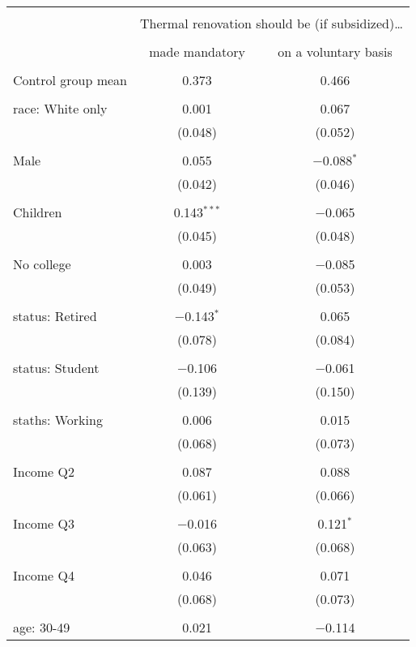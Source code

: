 
\begin{tabular}{@{\extracolsep{5pt}}lcc} 
\\[-1.8ex]\hline 
\hline \\[-1.8ex] 
 & \multicolumn{2}{c}{Thermal renovation should be (if subsidized)…} \\ 
\cline{2-3} 
\\[-1.8ex] & made mandatory & on a voluntary basis \\ 
\hline \\[-1.8ex] 
 Control group mean & 0.373 & 0.466  \\ \hline \\[-1.8ex] race: White only & 0.001 & 0.067 \\ 
  & (0.048) & (0.052) \\ 
  & & \\ 
 Male & 0.055 & $-$0.088$^{*}$ \\ 
  & (0.042) & (0.046) \\ 
  & & \\ 
 Children & 0.143$^{***}$ & $-$0.065 \\ 
  & (0.045) & (0.048) \\ 
  & & \\ 
 No college & 0.003 & $-$0.085 \\ 
  & (0.049) & (0.053) \\ 
  & & \\ 
 status: Retired & $-$0.143$^{*}$ & 0.065 \\ 
  & (0.078) & (0.084) \\ 
  & & \\ 
 status: Student & $-$0.106 & $-$0.061 \\ 
  & (0.139) & (0.150) \\ 
  & & \\ 
 staths: Working & 0.006 & 0.015 \\ 
  & (0.068) & (0.073) \\ 
  & & \\ 
 Income Q2 & 0.087 & 0.088 \\ 
  & (0.061) & (0.066) \\ 
  & & \\ 
 Income Q3 & $-$0.016 & 0.121$^{*}$ \\ 
  & (0.063) & (0.068) \\ 
  & & \\ 
 Income Q4 & 0.046 & 0.071 \\ 
  & (0.068) & (0.073) \\ 
  & & \\ 
 age: 30-49 & 0.021 & $-$0.114 \\ 

\end{tabular}
